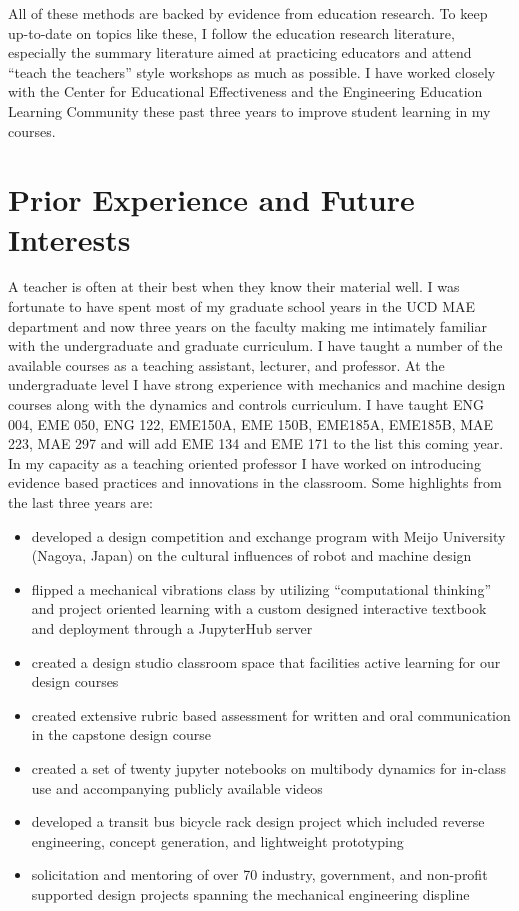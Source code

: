\documentclass{article}
\begin{document}
All of these methods are backed by evidence from education research. To keep
up-to-date on topics like these, I follow the education research literature,
especially the summary literature aimed at practicing educators and attend
``teach the teachers'' style workshops as much as possible. I have worked
closely with the Center for Educational Effectiveness and the Engineering
Education Learning Community these past three years to improve student
learning in my courses.

\section*{Prior Experience and Future Interests}
%
A teacher is often at their best when they know their material well. I was
fortunate to have spent most of my graduate school years in the UCD MAE
department and now three years on the faculty making me intimately familiar
with the undergraduate and graduate curriculum. I have taught a number of the
available courses as a teaching assistant, lecturer, and professor. At the
undergraduate level I have strong experience with mechanics and machine design
courses along with the dynamics and controls curriculum. I have taught ENG 004,
EME 050, ENG 122, EME150A, EME 150B, EME185A, EME185B, MAE 223, MAE 297 and
will add EME 134 and EME 171 to the list this coming year. In my capacity as a
teaching oriented professor I have worked on introducing evidence based
practices and innovations in the classroom. Some highlights from the last three
years are:

\begin{itemize}
    \setlength\itemsep{0.1em}
  \item developed a design competition and exchange program with Meijo
    University (Nagoya, Japan) on the cultural influences of robot and machine
    design
  \item flipped a mechanical vibrations class by utilizing ``computational
    thinking'' and project oriented learning with a custom designed interactive
    textbook and deployment through a JupyterHub server
  \item created a design studio classroom space that facilities active learning
    for our design courses
  \item created extensive rubric based assessment for written and oral
    communication in the capstone design course
  \item created a set of twenty jupyter notebooks on multibody dynamics for
    in-class use and accompanying publicly available videos
  \item developed a transit bus bicycle rack design project which included
    reverse engineering, concept generation, and lightweight prototyping
  \item solicitation and mentoring of over 70 industry, government, and
    non-profit supported design projects spanning the mechanical engineering
    displine
\end{itemize}
\end{document}
